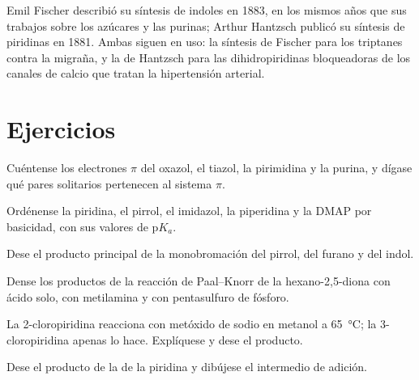 \begin{history}
Emil Fischer describió su síntesis de indoles en 1883, en los mismos años que sus
trabajos sobre los azúcares y las purinas; Arthur Hantzsch publicó su síntesis de piridinas
en 1881. Ambas siguen en uso: la síntesis de Fischer para los
triptanes contra la migraña, y la de Hantzsch para las dihidropiridinas
bloqueadoras de los canales de calcio que tratan la hipertensión arterial.
\end{history}

\section{Ejercicios}

\begin{exercise}[$\star$]\label{exo:b3:heterocycles:1}
Cuéntense los electrones $\pi$ del oxazol, el tiazol, la pirimidina y la purina, y dígase qué
pares solitarios pertenecen al sistema $\pi$.
\end{exercise}

\begin{exercise}[$\star$]\label{exo:b3:heterocycles:2}
Ordénense la piridina, el pirrol, el imidazol, la piperidina y la DMAP por basicidad, con sus
valores de $\mathrm pK_a$.
\end{exercise}

\begin{exercise}[$\star$]\label{exo:b3:heterocycles:3}
Dese el producto principal de la monobromación del pirrol, del furano y del indol.
\end{exercise}

\begin{exercise}[$\star$]\label{exo:b3:heterocycles:4}
Dense los productos de la reacción de Paal--Knorr de la hexano-2,5-diona con ácido solo,
con metilamina y con pentasulfuro de fósforo.
\end{exercise}

\begin{exercise}[$\star\star$]\label{exo:b3:heterocycles:5}
La 2-cloropiridina reacciona con metóxido de sodio en metanol a \qty{65}{\celsius}; la 3-cloropiridina
apenas lo hace. Explíquese y dese el producto.
\end{exercise}

\begin{exercise}[$\star\star$]\label{exo:b3:heterocycles:6}
Dese el producto de la  de la piridina y dibújese el intermedio
de adición.
\end{exercise}

